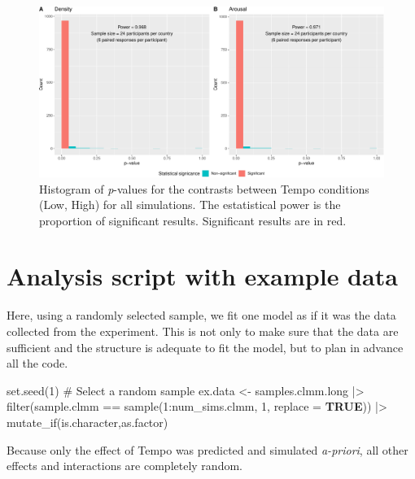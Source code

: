 \documentclass[
  bookmarksnumbered]{article}
\newenvironment{Shaded}{\begin{snugshade}}{\end{snugshade}}
\newcommand{\AttributeTok}[1]{\textcolor[rgb]{0.80,0.80,0.80}{#1}}
\newcommand{\CommentTok}[1]{\textcolor[rgb]{0.50,0.62,0.50}{#1}}
\newcommand{\ConstantTok}[1]{\textcolor[rgb]{0.86,0.64,0.64}{\textbf{#1}}}
\newcommand{\DecValTok}[1]{\textcolor[rgb]{0.86,0.86,0.80}{#1}}
\newcommand{\FunctionTok}[1]{\textcolor[rgb]{0.94,0.94,0.56}{#1}}
\newcommand{\NormalTok}[1]{\textcolor[rgb]{0.80,0.80,0.80}{#1}}
\newcommand{\OtherTok}[1]{\textcolor[rgb]{0.94,0.94,0.56}{#1}}
\newcommand{\SpecialCharTok}[1]{\textcolor[rgb]{0.86,0.64,0.64}{#1}}
\begin{document}
\begin{figure}
\centering
\includegraphics{Power_analysis_files/figure-latex/unnamed-chunk-15-1.pdf}
\caption{\label{fig:unnamed-chunk-15}Histogram of \emph{p}-values for the contrasts between Tempo conditions (Low, High) for all simulations. The estatistical power is the proportion of significant results. Significant results are in red.}
\end{figure}

\hypertarget{example-data}{%
\section{Analysis script with example data}\label{example-data}}

Here, using a randomly selected sample, we fit one model as if it was the data collected from the experiment. This is not only to make sure that the data are sufficient and the structure is adequate to fit the model, but to plan in advance all the code.

\begin{Shaded}
\begin{Highlighting}[]
\FunctionTok{set.seed}\NormalTok{(}\DecValTok{1}\NormalTok{)}
\CommentTok{\# Select a random sample}
\NormalTok{ex.data }\OtherTok{\textless{}{-}}\NormalTok{ samples.clmm.long  }\SpecialCharTok{|\textgreater{}} 
  \FunctionTok{filter}\NormalTok{(sample.clmm }\SpecialCharTok{==} \FunctionTok{sample}\NormalTok{(}\DecValTok{1}\SpecialCharTok{:}\NormalTok{num\_sims.clmm, }\DecValTok{1}\NormalTok{, }\AttributeTok{replace =} \ConstantTok{TRUE}\NormalTok{)) }\SpecialCharTok{|\textgreater{}} 
  \FunctionTok{mutate\_if}\NormalTok{(is.character,as.factor)}
\end{Highlighting}
\end{Shaded}

Because only the effect of Tempo was predicted and simulated \emph{a-priori}, all other effects and interactions are completely random.
\end{document}
